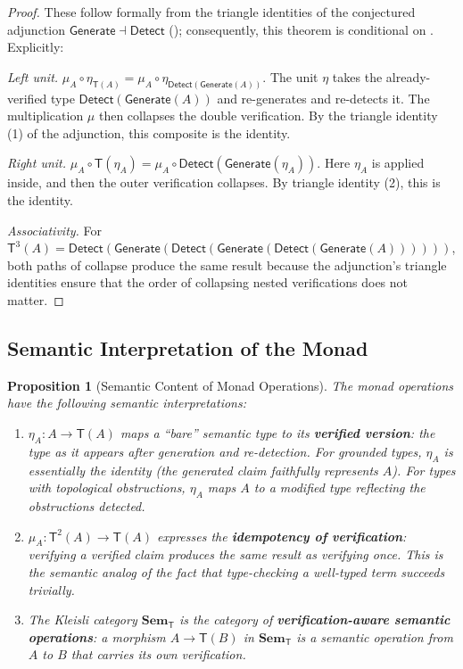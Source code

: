 \documentclass[11pt,a4paper]{article}
\theoremstyle{plain}
\newtheorem{proposition}[theorem]{Proposition}
\theoremstyle{definition}
\theoremstyle{remark}
\newcommand{\Sem}{\mathbf{Sem}}
\newcommand{\Detect}{\mathsf{Detect}}
\newcommand{\Generate}{\mathsf{Generate}}
\newcommand{\SemanticT}{\mathsf{T}}
\begin{document}
\begin{proof}
These follow formally from the triangle identities of the conjectured adjunction $\Generate \dashv \Detect$ (); consequently, this theorem is conditional on . Explicitly:

\emph{Left unit.} $\mu_A \circ \eta_{\SemanticT(A)} = \mu_A \circ \eta_{\Detect(\Generate(A))}$. The unit $\eta$ takes the already-verified type $\Detect(\Generate(A))$ and re-generates and re-detects it. The multiplication $\mu$ then collapses the double verification. By the triangle identity (1) of the adjunction, this composite is the identity.

\emph{Right unit.} $\mu_A \circ \SemanticT(\eta_A) = \mu_A \circ \Detect(\Generate(\eta_A))$. Here $\eta_A$ is applied inside, and then the outer verification collapses. By triangle identity (2), this is the identity.

\emph{Associativity.} For $\SemanticT^3(A) = \Detect(\Generate(\Detect(\Generate(\Detect(\Generate(A))))))$, both paths of collapse produce the same result because the adjunction's triangle identities ensure that the order of collapsing nested verifications does not matter.
\end{proof}

\subsection{Semantic Interpretation of the Monad}

\begin{proposition}[Semantic Content of Monad Operations]\label{prop:monad-semantics}
The monad operations have the following semantic interpretations:
\begin{enumerate}[nosep]
  \item $\eta_A\colon A \to \SemanticT(A)$ maps a ``bare'' semantic type to its \textbf{verified version}: the type as it appears after generation and re-detection. For grounded types, $\eta_A$ is essentially the identity (the generated claim faithfully represents $A$). For types with topological obstructions, $\eta_A$ maps $A$ to a modified type reflecting the obstructions detected.

  \item $\mu_A\colon \SemanticT^2(A) \to \SemanticT(A)$ expresses the \textbf{idempotency of verification}: verifying a verified claim produces the same result as verifying once. This is the semantic analog of the fact that type-checking a well-typed term succeeds trivially.

  \item The Kleisli category $\Sem_{\SemanticT}$ is the category of \textbf{verification-aware semantic operations}: a morphism $A \to \SemanticT(B)$ in $\Sem_{\SemanticT}$ is a semantic operation from $A$ to $B$ that carries its own verification.
\end{enumerate}
\end{proposition}
\end{document}
